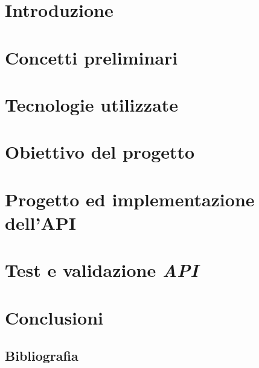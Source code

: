 \documentclass{article}
\begin{document}
\newpage
\thispagestyle{empty}
\mbox{}
\newpage

\tableofcontents 



\newpage
\section{Introduzione}

\begin{onehalfspacing}

\end{onehalfspacing}


\clearpage
\section{Concetti preliminari}

\begin{onehalfspacing}

\end{onehalfspacing}

\clearpage
\section{Tecnologie utilizzate}

\begin{onehalfspacing}

\end{onehalfspacing}

\clearpage

\section{Obiettivo del progetto}
\begin{onehalfspacing}

\end{onehalfspacing}

\clearpage
\section{Progetto ed implementazione dell'API}
\begin{onehalfspacing}
    
\end{onehalfspacing}

\clearpage
\section{Test e validazione \textit{API}}
\begin{onehalfspacing}
    
\end{onehalfspacing}



\clearpage
\section{Conclusioni}
\begin{onehalfspacing}
  
\end{onehalfspacing}
\clearpage

\begin{onehalfspacing}
\section{Bibliografia}
\renewcommand{\section}[2]{}

  
\end{onehalfspacing}
\end{document}

